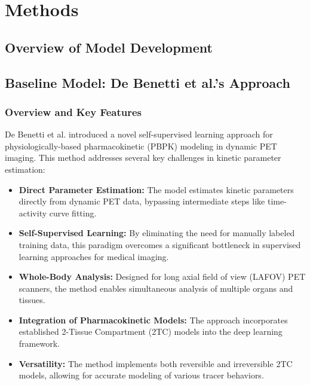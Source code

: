 
\chapter{Methods}\label{chapter:methods}

\section{Overview of Model Development}
\section{Baseline Model: De Benetti et al.'s Approach}

\subsection{Overview and Key Features}
De Benetti et al. introduced a novel self-supervised learning approach for physiologically-based pharmacokinetic (PBPK) modeling in dynamic PET imaging. This method addresses several key challenges in kinetic parameter estimation:

\begin{itemize}
    \item \textbf{Direct Parameter Estimation:} The model estimates kinetic parameters directly from dynamic PET data, bypassing intermediate steps like time-activity curve fitting.
    
    \item \textbf{Self-Supervised Learning:} By eliminating the need for manually labeled training data, this paradigm overcomes a significant bottleneck in supervised learning approaches for medical imaging.
    
    \item \textbf{Whole-Body Analysis:} Designed for long axial field of view (LAFOV) PET scanners, the method enables simultaneous analysis of multiple organs and tissues.
    
    \item \textbf{Integration of Pharmacokinetic Models:} The approach incorporates established 2-Tissue Compartment (2TC) models into the deep learning framework.
    
    \item \textbf{Versatility:} The method implements both reversible and irreversible 2TC models, allowing for accurate modeling of various tracer behaviors.
\end{itemize}

